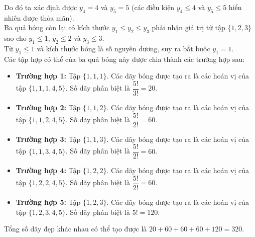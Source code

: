 \begin{ex}
{			Do đó ta xác định được $y_4 = 4$ và $y_5 = 5$ (các điều kiện $y_4 \le 4$ và $y_5 \le 5$ hiển nhiên được thỏa mãn).\\
			Ba quả bóng còn lại có kích thước $y_1 \le y_2 \le y_3$ phải nhận giá trị từ tập $\{1, 2, 3\}$ sao cho $y_1 \le 1$, $y_2 \le 2$ và $y_3 \le 3$.\\
			Từ $y_1 \le 1$ và kích thước bóng là số nguyên dương, suy ra bắt buộc $y_1=1$. \\
			Các tập hợp có thể của ba quả bóng này được chia thành các trường hợp sau:
	\begin{itemize}
		\item {\color{blue}\textbf{Trường hợp 1:}} Tập $\{1, 1, 1\}$.
		Các dãy bóng được tạo ra là các hoán vị của tập $\{1, 1, 1, 4, 5\}$. Số dãy phân biệt là $\dfrac{5!}{3!} = 20$.
		\item {\color{blue}\textbf{Trường hợp 2:}} Tập $\{1, 1, 2\}$.
		Các dãy bóng được tạo ra là các hoán vị của tập $\{1, 1, 2, 4, 5\}$. Số dãy phân biệt là $\dfrac{5!}{2!} = 60$.
		\item {\color{blue}\textbf{Trường hợp 3:}} Tập $\{1, 1, 3\}$.
		Các dãy bóng được tạo ra là các hoán vị của tập $\{1, 1, 3, 4, 5\}$. Số dãy phân biệt là $\dfrac{5!}{2!} = 60$.
		\item {\color{blue}\textbf{Trường hợp 4:}} Tập $\{1, 2, 2\}$.
		Các dãy bóng được tạo ra là các hoán vị của tập $\{1, 2, 2, 4, 5\}$. Số dãy phân biệt là $\dfrac{5!}{2!} = 60$.
		\item {\color{blue}\textbf{Trường hợp 5:}} Tập $\{1, 2, 3\}$.
		Các dãy bóng được tạo ra là các hoán vị của tập $\{1, 2, 3, 4, 5\}$. Số dãy phân biệt là $5! = 120$.
		\end{itemize}
		Tổng số dãy đẹp khác nhau có thể tạo được là $20 + 60 + 60 + 60 + 120 = 320$.
	}
\end{ex}
